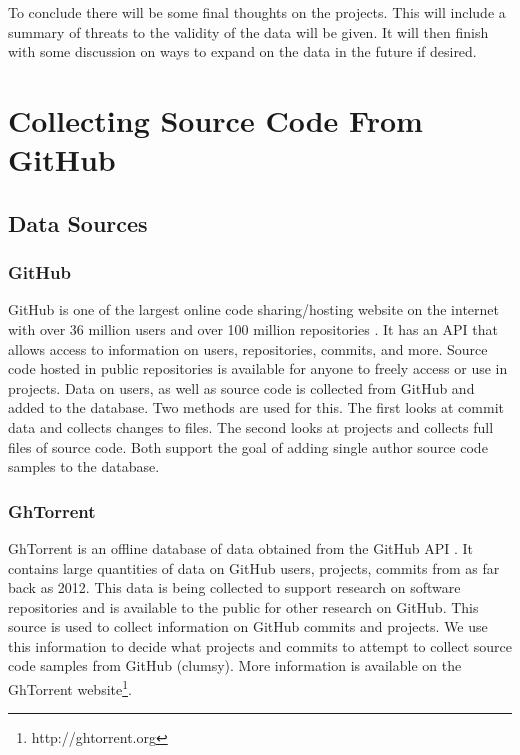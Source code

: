 \documentclass{article}
\begin{document}
To conclude there will be some final thoughts on the projects. This will include a summary of threats to the validity of the data will be given. It will then finish with some discussion on ways to expand on the data in the future if desired.


\section{Collecting Source Code From GitHub}


\subsection{Data Sources}
\subsubsection*{GitHub}
GitHub is one of the largest online code sharing/hosting website on the internet with over 36 million users and over 100 million repositories \cite{WEBSITE:Git1}. It has an API that allows access to information on users, repositories, commits, and more. Source code hosted in public repositories is available for anyone to freely access or use in projects. Data on users, as well as source code is collected from GitHub and added to the database. Two methods are used for this. The first looks at commit data and collects changes to files. The second looks at projects and collects full files of source code. Both support the goal of adding single author source code samples to the database.

\subsubsection*{GhTorrent}
\begin{sloppypar}
GhTorrent is an offline database of data obtained from the GitHub API \cite{Gousi13}. It contains large quantities of data on GitHub users, projects, commits from as far back as 2012. This data is being collected to support research on software repositories and is available to the public for other research on GitHub. This source is used to collect information on GitHub commits and projects. We use this information to decide what projects and commits to attempt to collect source code samples from GitHub (clumsy). More information is available on the GhTorrent website\footnote{http://ghtorrent.org}.\end{sloppypar}
\end{document}
